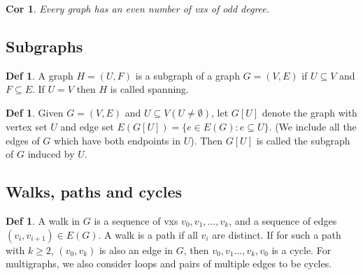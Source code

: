 \documentclass[11pt, fleqn, a4paper, landscape]{article}
\theoremstyle{plain} %
\newtheorem{cor}[thm]{Cor}
\theoremstyle{remark} %
\theoremstyle{definition} %
\newtheorem{defi}[thm]{Def}
\begin{document}
\begin{multicols}{5}
\begin{cor}
Every graph has an even number of vxs of odd degree.
\end{cor}

\subsection{Subgraphs}

\begin{defi}
A graph $H = (U, F)$ is a subgraph of a graph $G = (V,E)$ if $U \subseteq V$ and $F \subseteq E$. If $U = V$ then $H$ is called spanning.
\end{defi}

\begin{defi}
Given $G = (V,E)$ and $U\subseteq  V (U \ne \emptyset)$, let $G[U]$ denote the graph with vertex set $U$ and edge set $E(G[U]) = \{e \in E(G) : e \subseteq U\}$. (We include all the edges of $G$ which have both
endpoints in $U$). Then $G[U]$ is called the subgraph of $G$ induced by $U$.
\end{defi}
\addtocounter{thm}{1}
\addtocounter{subsection}{1} 

\addtocounter{thm}{1}
\addtocounter{thm}{1}
\subsection{Walks, paths and cycles}

\begin{defi}
A walk in $G$ is a sequence of vxs $v_0, v_1, \dots , v_k$, and a sequence of edges $(v_i, v_{i+1}) \in E(G)$. A walk is a path if all $v_i$ are distinct. If for such a path with $k \ge 2$, $(v_0, v_k)$ is also
an edge in $G$, then $v_0, v_1 \dots , v_k, v_0$ is a cycle. For multigraphs, we also consider loops and pairs of multiple edges to be cycles.
\end{defi}


\end{multicols}
\end{document}
